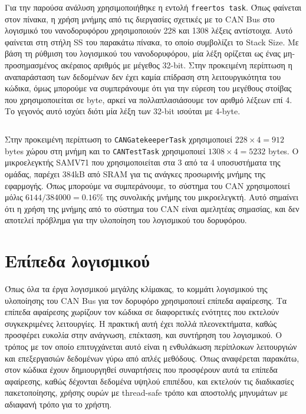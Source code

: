 \documentclass[a4paper,nobib,justified]{tufte-book}
\begin{document}
Για την παρούσα ανάλυση χρησιμοποιήθηκε η εντολή \texttt{freertos task}. Όπως φαίνεται στον πίνακα, η χρήση μνήμης από τις διεργασίες σχετικές με το CAN Bus στο λογισμικό του νανοδορυφόρου χρησιμοποιούν 228 και 1308 λέξεις αντίστοιχα. Αυτό φαίνεται στη στήλη SS του παρακάτω πίνακα, το οποίο συμβολίζει το Stack Size. Με βάση τη ρύθμιση του λογισμικού του νανοδορυφόρου, μία λέξη ορίζεται ως ένας μη-προσημασμένος ακέραιος αριθμός με μέγεθος 32-bit. Στην προκειμένη περίπτωση η αναπαράσταση των δεδομένων δεν έχει καμία επίδραση στη λειτουργικότητα του κώδικα, όμως μπορούμε να συμπεράνουμε ότι για την εύρεση του μεγέθους στοίβας που χρησιμοποιείται σε byte, αρκεί να πολλαπλασιάσουμε τον αριθμό λέξεων επί 4. Το γεγονός αυτό ισχύει διότι μία λέξη των 32-bit ισούται με 4-byte.
\inputminted[breaklines=false,linenos=false]{c++}{code/examples/can-memory-usage.cpp}

Στην προκειμένη περίπτωση το \texttt{CANGatekeeperTask} χρησιμοποιεί $ 228 \times 4 = 912 $ bytes χώρου στη μνήμη και το \texttt{CANTestTask} χρησιμοποιεί $ 1308 \times 4 = 5232 $ bytes. Ο μικροελεγκτής SAMV71 που χρησιμοποιείται στα 3 από τα 4 υποσυστήματα της ομάδας, παρέχει 384kB από SRAM για τις ανάγκες προσωρινής μνήμης της εφαρμογής. Όπως μπορούμε να συμπεράνουμε, το σύστημα του CAN χρησιμοποιεί μόλις $ 6144 / 384000 = 0.16\% $ της συνολικής μνήμης του μικροελεγκτή. Αυτό σημαίνει ότι η χρήση της μνήμης από το σύστημα του CAN είναι αμελητέας σημασίας, και δεν αποτελεί πρόβλημα για την υλοποίηση του λογισμικού του δορυφόρου.

\clearpage
\section{Επίπεδα λογισμικού}
Όπως όλα τα έργα λογισμικού μεγάλης κλίμακας, το κομμάτι λογισμικού της υλοποίησης του CAN Bus για τον δορυφόρο χρησιμοποιεί επίπεδα αφαίρεσης. Τα επίπεδα αφαίρεσης χωρίζουν τον κώδικα σε διαφορετικές ενότητες που εκτελούν συγκεκριμένες λειτουργίες. Η πρακτική αυτή έχει πολλά πλεονεκτήματα, καθώς προσφέρει ευκολία στην ανάγνωση, επέκταση, και συντήρηση του λογισμικού. Ο τρόπος με τον οποίο επιτυγχάνεται αυτό είναι η ενθυλάκωση περίπλοκων λειτουργιών και επεξεργασιών δεδομένων γύρω από απλές μεθόδους. Όπως αναφέρεται παρακάτω, στον κώδικα έχουν δημιουργηθεί συναρτήσεις που προσφέρουν αυτά τα επίπεδα αφαίρεσης, καθώς δέχονται δεδομένα υψηλού επιπέδου, και εκτελούν τις διαδικασίες πακετοποίησης, χρήσης ουρών με thread-safe τρόπο και αποστολής μηνυμάτων με αδιαφανή τρόπο για το χρήστη.
\end{document}
